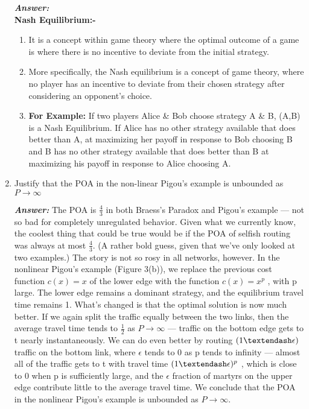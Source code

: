 \documentclass[15pt]{article}
\begin{document}
\begin{enumerate}
\textbf{\emph{Answer: }}\\ \textbf{Nash Equilibrium:-}
\begin{enumerate}
\item It is a concept within game theory where the optimal outcome of a game is where there is no incentive to deviate from the initial strategy.
\item More specifically, the Nash equilibrium is a concept of game theory, where no player has an incentive to deviate from their chosen strategy after considering an opponent's choice.
\item \textbf{For Example:} If two players Alice \& Bob choose strategy A \& B, (A,B) is a Nash Equilibrium. If Alice has no other strategy available that does better than A, at maximizing her payoff in response to Bob choosing B and B has no other strategy available that does better than B at maximizing his payoff in response to Alice choosing A.
\end{enumerate}
\item Justify that the POA in the non-linear Pigou's example is unbounded as $P \to \infty$

\textbf{\emph{Answer: }} The POA is $\frac{4}{3}$ in both Braess’s Paradox and Pigou’s example — not so bad for completely unregulated behavior. Given what we currently know, the coolest thing that could be true would be if the POA of selfish routing was always at most $\frac{4}{3}$. (A rather bold guess, given that we've only looked at two examples.) The story is not so rosy in all networks, however. In the nonlinear Pigou’s example (Figure 3(b)), we replace the previous cost function $c(x) = x$ of the lower edge with the function $c(x) = x^p$ , with p large. The lower edge remains a
dominant strategy, and the equilibrium travel time remains 1. What’s changed is that the optimal solution is now much better. If we again split the traffic equally between the two links, then the average travel time tends to $\frac{1}{2}$ as $P \to \infty$ — traffic on the bottom edge gets to t nearly instantaneously. We can do even better by routing $(1\textendash\epsilon)$ traffic on the bottom
link, where $\epsilon$ tends to 0 as p tends to infinity — almost all of the traffic gets to t with travel
time $(1\textendash\epsilon)^p$ , which is close to 0 when p is sufficiently large, and the $\epsilon$ fraction of martyrs
on the upper edge contribute little to the average travel time. We conclude that the POA in the nonlinear Pigou’s example is unbounded as $P \to \infty$.


\end{enumerate}
\end{document}
